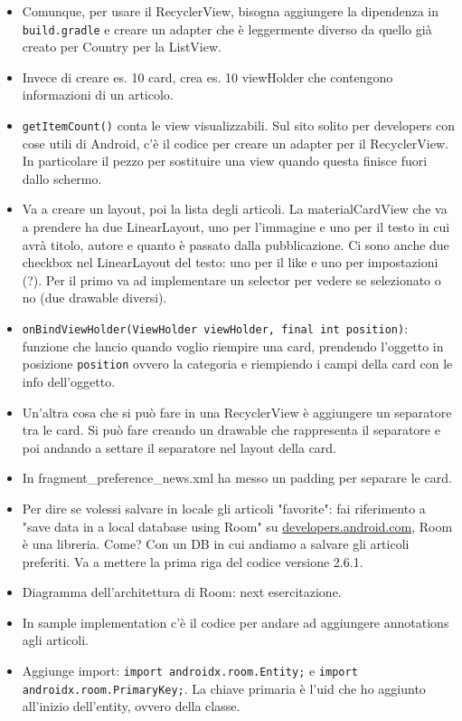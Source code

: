 \begin{itemize}
    \item Comunque, per usare il RecyclerView, bisogna aggiungere la dipendenza in \texttt{build.gradle} e creare un adapter che è leggermente diverso da quello già creato per Country per la ListView.
    \item Invece di creare es. 10 card, crea es. 10 viewHolder che contengono informazioni di un articolo.
    \item \texttt{getItemCount()} conta le view visualizzabili. Sul sito solito per developers con cose utili di Android, c'è il codice per creare un adapter per il RecyclerView. In particolare il pezzo per sostituire una view quando questa finisce fuori dallo schermo.
    \item Va a creare un layout, poi la lista degli articoli. La materialCardView che va a prendere ha due LinearLayout, uno per l'immagine e uno per il testo in cui avrà titolo, autore e quanto è passato dalla pubblicazione. Ci sono anche due checkbox nel LinearLayout del testo: uno per il like e uno per impostazioni (?). Per il primo va ad implementare un selector per vedere se selezionato o no (due drawable diversi).
    \item \texttt{onBindViewHolder(ViewHolder viewHolder, final int position)}: funzione che lancio quando voglio riempire una card, prendendo l'oggetto in posizione \texttt{position} ovvero la categoria e riempiendo i campi della card con le info dell'oggetto.
    \item Un'altra cosa che si può fare in una RecyclerView è aggiungere un separatore tra le card. Si può fare creando un drawable che rappresenta il separatore e poi andando a settare il separatore nel layout della card.
    \item In fragment\_preference\_news.xml ha messo un padding per separare le card.
    \item Per dire se volessi salvare in locale gli articoli "favorite": fai riferimento a "save data in a local database using Room" su \url{developers.android.com}, Room è una libreria. Come? Con un DB in cui andiamo a salvare gli articoli preferiti. Va a mettere la prima riga del codice versione 2.6.1.
    \item Diagramma dell'architettura di Room: next esercitazione.
    \item In sample implementation c'è il codice per andare ad aggiungere annotations agli articoli.
    \item Aggiunge import: \texttt{import androidx.room.Entity;} e \texttt{import androidx.room.PrimaryKey;}. La chiave primaria è l'uid che ho aggiunto all'inizio dell'entity, ovvero della classe.

\end{itemize}
